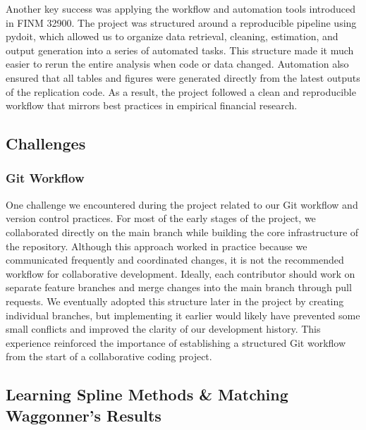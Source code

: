 \documentclass{article}
\begin{document}
Another key success was applying the workflow and automation tools introduced in FINM 32900. The project was structured around a reproducible pipeline using pydoit, which allowed us to organize data retrieval, cleaning, estimation, and output generation into a series of automated tasks. This structure made it much easier to rerun the entire analysis when code or data changed. Automation also ensured that all tables and figures were generated directly from the latest outputs of the replication code. As a result, the project followed a clean and reproducible workflow that mirrors best practices in empirical financial research.

\subsection{Challenges}

\subsubsection{Git Workflow}

One challenge we encountered during the project related to our Git workflow and version control practices. For most of the early stages of the project, we collaborated directly on the main branch while building the core infrastructure of the repository. Although this approach worked in practice because we communicated frequently and coordinated changes, it is not the recommended workflow for collaborative development. Ideally, each contributor should work on separate feature branches and merge changes into the main branch through pull requests. We eventually adopted this structure later in the project by creating individual branches, but implementing it earlier would likely have prevented some small conflicts and improved the clarity of our development history. This experience reinforced the importance of establishing a structured Git workflow from the start of a collaborative coding project.

\subsection{Learning Spline Methods \& Matching Waggonner's Results}
\end{document}
